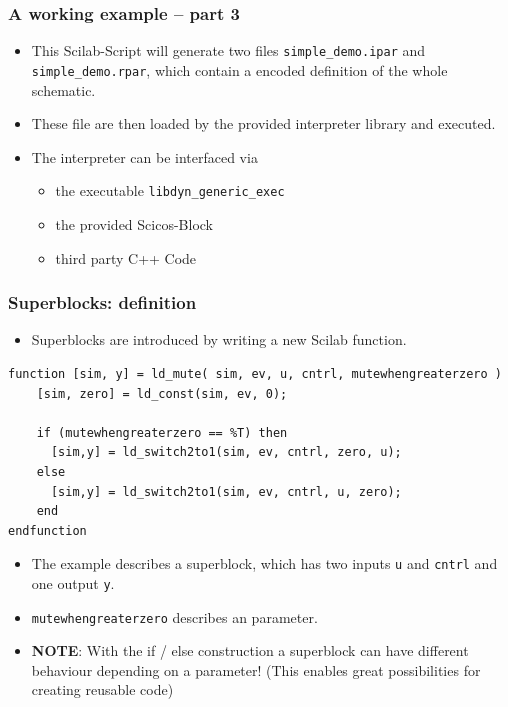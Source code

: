 \documentclass[serif,9pt,xcolor=dvipsnames]{beamer}
\begin{document}
\begin{frame}[fragile]
  \frametitle{A working example -- part 3}
 \begin{itemize}
  \item This Scilab-Script will generate two files \texttt{simple\_demo.ipar} and \texttt{simple\_demo.rpar}, which contain a encoded definition of the whole schematic.
\item These file are then loaded by the provided interpreter library and executed.
\item The interpreter can be interfaced via
  \begin{itemize}
   \item the executable \texttt{libdyn\_generic\_exec}
   \item the provided Scicos-Block
   \item third party C++ Code
  \end{itemize}
 \end{itemize}

\end{frame}


\begin{frame}[fragile]
 \frametitle{Superblocks: definition}
 
\begin{itemize}
 \item Superblocks are introduced by writing a new Scilab function.
\end{itemize}

{\small 
\begin{lstlisting} 
function [sim, y] = ld_mute( sim, ev, u, cntrl, mutewhengreaterzero )
    [sim, zero] = ld_const(sim, ev, 0);
    
    if (mutewhengreaterzero == %T) then
      [sim,y] = ld_switch2to1(sim, ev, cntrl, zero, u);
    else
      [sim,y] = ld_switch2to1(sim, ev, cntrl, u, zero);
    end
endfunction
\end{lstlisting}}

\begin{itemize}
 \item The example describes a superblock, which has two inputs \texttt{u} and \texttt{cntrl} and one output \texttt{y}.
\item \texttt{mutewhengreaterzero} describes an parameter.
\item \textbf{NOTE}: With the if / else construction a superblock can have different behaviour depending on a parameter! (This enables great possibilities for creating reusable code)
\end{itemize}


\end{frame}
\end{document}
